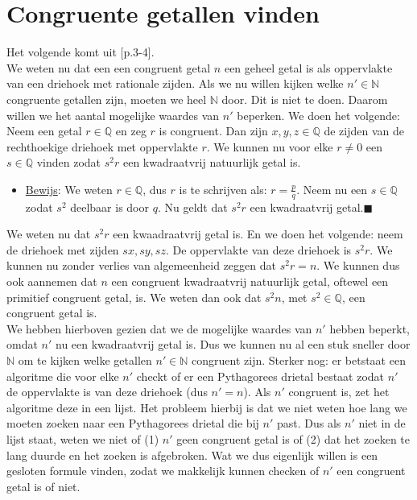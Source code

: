 \documentclass[12pt,reqno]{article}
\newcommand*{\NN}{\ensuremath{\mathbb{N}}}
\newcommand*{\QQ}{\ensuremath{\mathbb{Q}}}
\newcommand*{\QED}{\hfill\ensuremath{\blacksquare}}
\begin{document}
	\section{Congruente getallen vinden}
	Het volgende komt uit \cite{Koblitz}[p.3-4].\\
	We weten nu dat een een congruent getal $n$ een geheel getal is als oppervlakte van een driehoek met rationale zijden. Als we nu willen kijken welke $n'\in\NN$ congruente getallen zijn, moeten we heel $\NN$ door. Dit is niet te doen. Daarom willen we het aantal mogelijke waardes van $n'$ beperken. We doen het volgende:\\
	Neem een getal $r\in\QQ$ en zeg $r$ is congruent. Dan zijn $x,y,z\in\QQ$ de zijden van de rechthoekige driehoek met oppervlakte $r$. We kunnen nu voor elke $r\neq0$ een $s\in\QQ$ vinden zodat $s^2r$ een kwadraatvrij natuurlijk getal is.
	\begin{itemize}
		\item[] \underline{Bewijs}: We weten $r\in\QQ$, dus $r$ is te schrijven als: $r=\frac{p}{q}$. Neem nu een $s\in\QQ$ zodat $s^2$ deelbaar is door $q$. {\color{red}Nu geldt dat $s^2r$ een kwadraatvrij getal.}\QED
	\end{itemize}
	We weten nu dat $s^2r$ een kwaadraatvrij getal is. En we doen het volgende: neem de driehoek met zijden $sx,sy,sz$. De oppervlakte van deze driehoek is $s^2r$. We kunnen nu zonder verlies van algemeenheid zeggen dat $s^2r=n$. We kunnen dus ook aannemen dat $n$ een congruent kwadraatvrij natuurlijk getal, oftewel een primitief congruent getal, is. We weten dan ook dat $s^2n$, met $s^2\in\QQ$, een congruent getal is.  \\
	
	We hebben hierboven gezien dat we de mogelijke waardes van $n'$ hebben beperkt, omdat $n'$ nu een kwadraatvrij getal is. Dus we kunnen nu al een stuk sneller door $\NN$ om te kijken welke getallen $n'\in\NN$ congruent zijn. Sterker nog: er betstaat een algoritme die voor elke $n'$ checkt of er een Pythagorees drietal bestaat zodat $n'$ de oppervlakte is van deze driehoek (dus $n'=n$). Als $n'$ congruent is, zet het algoritme deze in een lijst. Het probleem hierbij is dat we niet weten hoe lang we moeten zoeken naar een Pythagorees drietal die bij $n'$ past. Dus als $n'$ niet in de lijst staat, weten we niet of (1) $n'$ geen congruent getal is of (2) dat het zoeken te lang duurde en het zoeken is afgebroken. Wat we dus eigenlijk willen is een gesloten formule vinden, zodat we makkelijk kunnen checken of $n'$ een congruent getal is of niet.\\
	
\end{document}
